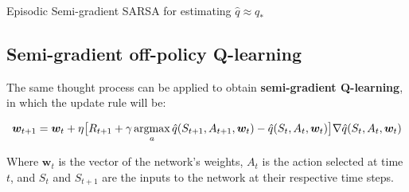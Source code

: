\begin{algorithm}[H]
\SetAlgoLined
{}

\caption{Episodic Semi-gradient SARSA for estimating $\hat{q} \approx q_*$}
\end{algorithm}

\subsection{Semi-gradient off-policy Q-learning}
The same thought process can be applied to obtain \textbf{semi-gradient Q-learning}, in which the update rule will be:

\begin{equation}
    \boldsymbol{w}_{t+1} = \boldsymbol{w}_t + \eta \big[ R_{t+1} + \gamma \operatorname*{argmax}_a  \hat{q}(S_{t+1},A_{t+1},\boldsymbol{w}_t) - \hat{q}(S_t,A_t,\boldsymbol{w}_t) \big] \nabla \hat{q}(S_t,A_t,\boldsymbol{w}_t)
    \label{eq:ch7-qlearningqvaluefunctionapproxssdweightupdate}
\end{equation}

Where $\boldsymbol{w}_t$ is the vector of the network’s weights, $A_t$ is the action selected at time $t$, and $S_t$ and $S_{t+1}$ are the inputs to the network at their respective time steps.

